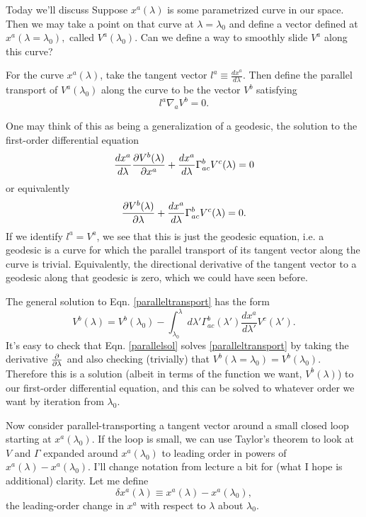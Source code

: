 Today we'll discuss  Suppose $x^a(\lambda)$ is some parametrized curve in our space. Then we may take a point on that curve at $\lambda=\lambda_0$ and define a vector defined at $x^a(\lambda=\lambda_0),$ called $V^a(\lambda_0)$. Can we define a way to smoothly slide $V^a$ along this curve?

For the curve $x^a(\lambda)$, take the tangent vector $l^a\equiv \frac{dx^a}{d\lambda}.$ Then define the parallel transport of $V^a(\lambda_0)$ along the curve to be the vector $V^b$ satisfying
\begin{equation}
    l^a \nabla_a V^b=0.
\end{equation}

One may think of this as being a generalization of a geodesic, the solution to the first-order differential equation
\begin{equation}\label{paralleltransportorig}
\frac{dx^a}{d\lambda}\frac{\p V^b(\lambda)}{\p x^a}+\frac{dx^a}{d\lambda}\Gamma^b_{ac}V^c(\lambda)=0
\end{equation}
or equivalently
\begin{equation}\label{paralleltransport}
\frac{\p V^b(\lambda)}{\p \lambda}+\frac{dx^a}{d\lambda}\Gamma^b_{ac}V^c(\lambda)=0.
\end{equation}
If we identify $l^a=V^a$, we see that this is just the geodesic equation, i.e. a geodesic is a curve for which the parallel transport of its tangent vector along the curve is trivial. Equivalently, the directional derivative of the tangent vector to a geodesic along that geodesic is zero, which we could have seen before.

The general solution to Eqn. \ref{paralleltransport} has the form
\begin{equation}\label{parallelsol}
V^b(\lambda)=V^b(\lambda_0)-\int_{\lambda_0}^\lambda d\lambda' \Gamma^b_{ac}(\lambda') \frac{dx^a}{d\lambda'}V^c(\lambda').
\end{equation}
It's easy to check that Eqn. \ref{parallelsol} solves \ref{paralleltransport} by taking the derivative $\P{}{\lambda}$ and also checking (trivially) that $V^b(\lambda=\lambda_0)=V^b(\lambda_0)$. Therefore this is a solution (albeit in terms of the function we want, $V^b(\lambda)$) to our first-order differential equation, and this can be solved to whatever order we want by iteration from $\lambda_0.$

Now consider parallel-transporting a tangent vector around a small closed loop starting at $x^a(\lambda_0)$. If the loop is small, we can use Taylor's theorem to look at $V$ and $\Gamma$ expanded around $x^a(\lambda_0)$ to leading order in powers of $x^a(\lambda)-x^a(\lambda_0)$. I'll change notation from lecture a bit for (what I hope is additional) clarity. Let me define
$$\delta x^a(\lambda) \equiv x^a(\lambda)-x^a(\lambda_0),$$
the leading-order change in $x^a$ with respect to $\lambda$ about $\lambda_0.$

